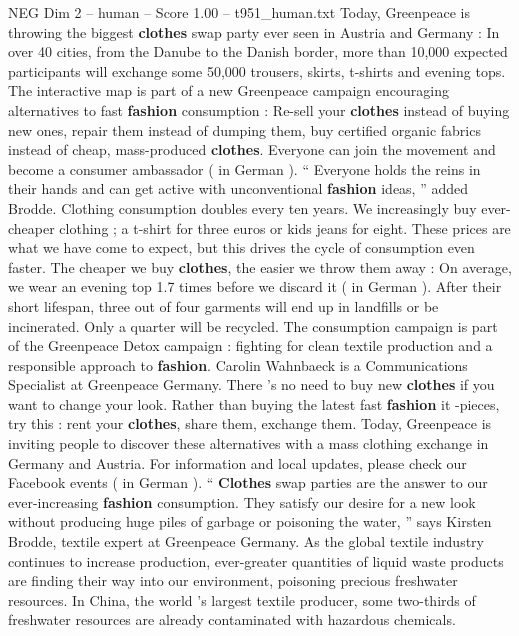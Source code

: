 \begin{textsample}{NEG Dim 2 – human – Score 1.00 – t951\_human.txt}  \label{ex:f2_neg_033}
Today, Greenpeace is throwing the biggest \textbf{clothes} swap party ever seen in Austria and Germany : In over 40 cities, from the Danube to the Danish border, more than 10,000 expected participants will exchange some 50,000 trousers, skirts, t-shirts and evening tops.
The interactive map is part of a new Greenpeace campaign encouraging alternatives to fast \textbf{fashion} consumption : Re-sell your \textbf{clothes} instead of buying new ones, repair them instead of dumping them, buy certified organic fabrics instead of cheap, mass-produced \textbf{clothes}.
Everyone can join the movement and become a consumer ambassador ( in German ). “ Everyone holds the reins in their hands and can get active with unconventional \textbf{fashion} ideas, ” added Brodde.
Clothing consumption doubles every ten years.
We increasingly buy ever-cheaper clothing ; a t-shirt for three euros or kids jeans for eight.
These prices are what we have come to expect, but this drives the cycle of consumption even faster.
The cheaper we buy \textbf{clothes}, the easier we throw them away : On average, we wear an evening top 1.7 times before we discard it ( in German ).
After their short lifespan, three out of four garments will end up in landfills or be incinerated.
Only a quarter will be recycled.
The consumption campaign is part of the Greenpeace Detox campaign : fighting for clean textile production and a responsible approach to \textbf{fashion}.
Carolin Wahnbaeck is a Communications Specialist at Greenpeace Germany.
There ’s no need to buy new \textbf{clothes} if you want to change your look.
Rather than buying the latest fast \textbf{fashion} it -pieces, try this : rent your \textbf{clothes}, share them, exchange them.
Today, Greenpeace is inviting people to discover these alternatives with a mass clothing exchange in Germany and Austria.
For information and local updates, please check our Facebook events ( in German ). “ \textbf{Clothes} swap parties are the answer to our ever-increasing \textbf{fashion} consumption.
They satisfy our desire for a new look without producing huge piles of garbage or poisoning the water, ” says Kirsten Brodde, textile expert at Greenpeace Germany.
As the global textile industry continues to increase production, ever-greater quantities of liquid waste products are finding their way into our environment, poisoning precious freshwater resources.
In China, the world ’s largest textile producer, some two-thirds of freshwater resources are already contaminated with hazardous chemicals.

\end{textsample}
